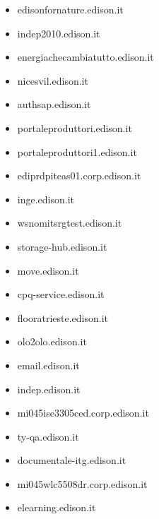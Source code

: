 \documentclass{article}
\begin{document}
\begin{itemize}
        \item edisonfornature.edison.it
    
        \item indep2010.edison.it
    
        \item energiachecambiatutto.edison.it
    
        \item nicesvil.edison.it
    
        \item authsap.edison.it
    
        \item portaleproduttori.edison.it
    
        \item portaleproduttori1.edison.it
    
        \item ediprdpiteas01.corp.edison.it
    
        \item inge.edison.it
    
        \item wsnomitsrgtest.edison.it
    
        \item storage-hub.edison.it
    
        \item move.edison.it
    
        \item cpq-service.edison.it
    
        \item flooratrieste.edison.it
    
        \item olo2olo.edison.it
    
        \item email.edison.it
    
        \item indep.edison.it
    
        \item mi045ise3305ced.corp.edison.it
    
        \item ty-qa.edison.it
    
        \item documentale-itg.edison.it
    
        \item mi045wlc5508dr.corp.edison.it
    
        \item elearning.edison.it
    

\end{itemize}
\end{document}
